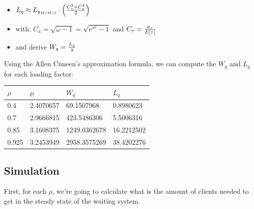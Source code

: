 \documentclass[]{article}
\providecommand{\tightlist}{%
  \setlength{\itemsep}{0pt}\setlength{\parskip}{0pt}}
\begin{document}
\begin{itemize}
\tightlist
\item
  \(L_{q} \approx L_{q_{M/M/1}} \cdot \left( C_{\tau}^{2} + C_{x}^{2} \over 2 \right)\)
\item
  with: \(C_{x} = \sqrt{ \omega - 1} = \sqrt{ e^{\sigma^{2}} - 1}\) and
  \(C_{\tau} = { \sigma_{\tau} \over E[\tau] }\)
\item
  and derive \(W_{q} = { L_{q} \over \lambda }\)
\end{itemize}

Using the Allen Cuneen's approximation formula, we can compute the
\(W_{q}\) and \(L_{q}\) for each loading factor:

\begin{longtable}[]{@{}llll@{}}
\toprule
\(\rho\) & \(\mu\) & \(W_{q}\) & \(L_{q}\)\tabularnewline
\midrule
\endhead
0.4 & 2.4070657 & 69.1507968 & 0.8980623\tabularnewline
0.7 & 2.9666815 & 423.5486306 & 5.5006316\tabularnewline
0.85 & 3.1608375 & 1249.0362678 & 16.2212502\tabularnewline
0.925 & 3.2453949 & 2958.3575269 & 38.4202276\tabularnewline
\bottomrule
\end{longtable}

\subsection{Simulation}\label{simulation}

First, for each \(\rho\), we're going to calculate what is the amount of
clients needed to get in the steady state of the waiting system.
\end{document}

